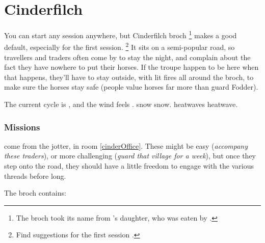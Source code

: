 \section{Cinderfilch }
\label{cinderfilch}




\begin{multicols}{2}

\noindent
You can start any session anywhere, but Cinderfilch \gls{broch}%
\footnote{The \gls{broch} took its name from 's daughter, who was eaten by .}
makes a good default, especially for the first session.%
\footnote{Find suggestions for the first session .}
It sits on a semi-popular road, so travellers and traders often come by to stay the night, and complain about the fact they have nowhere to put their horses.
If the troupe happen to be here when that happens, they'll have to stay outside, with lit fires all around the \gls{broch}, to make sure the horses stay safe (people value horses far more than \gls{guard} Fodder).

The current \gls{cycle} is \showCycle, and the wind feels \showTemperature.
\ifcase\value{temperature}%
  \Gls{snow} \glsdesc{snow}.
\or%
\or%
\else%
  \Glspl{heatwave} \glsdesc{heatwave}.
\fi%

\subsubsection{Missions}
come from the \gls{jotter}, in room \ref{cinderOffice}.%
These might be easy (\textit{accompany these traders}), or more challenging (\textit{guard that \gls{village} for a week}), but once they step onto the road, they should have a little freedom to engage with the various \glspl{thread} before long.

The \gls{broch} contains:

\null


\end{multicols}

